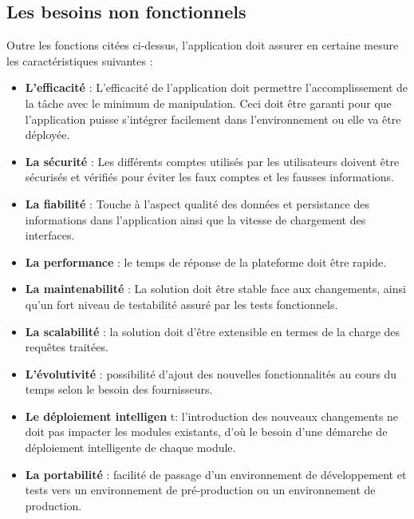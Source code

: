 \subsection{Les besoins non fonctionnels}
Outre les fonctions cit\'ees ci-dessus, l'application doit assurer en certaine mesure les caract\'eristiques suivantes :
\begin{itemize}
\item \textbf{L'efficacit\'e} : L'efficacit\'e de l'application doit permettre l'accomplissement de la t\^ache avec le minimum de manipulation. Ceci doit \^etre garanti pour que l'application puisse s'int\'egrer facilement dans l'environnement ou elle va \^etre d\'eploy\'ee.

\item \textbf{La s\'ecurit\'e} : Les diff\'erents comptes utilis\'es par les utilisateurs doivent \^etre s\'ecuris\'es et v\'erifi\'es pour \'eviter les faux comptes et les fausses informations.

\item \textbf{La fiabilit\'e} : Touche \`a l'aspect qualit\'e des donn\'ees et persistance des informations dans l'application ainsi que la vitesse de chargement des interfaces.
\item \textbf{La performance} : le temps de r\'eponse de la plateforme doit \^etre rapide.

\item \textbf{La maintenabilit\'e} : La solution doit \^etre stable face aux changements, ainsi qu'un fort niveau de testabilit\'e assur\'e par les tests fonctionnels.

\item \textbf{La scalabilit\'e} : la solution doit d'\^etre extensible en termes de la charge des requ\^etes trait\'ees.

\item \textbf{L'\'evolutivit\'e} : possibilit\'e d'ajout des nouvelles fonctionnalit\'es au cours du temps selon le besoin des fournisseurs.

\item \textbf{Le d\'eploiement intelligen} t: l'introduction des nouveaux changements ne doit pas impacter les modules existants, d'o\`u le besoin d'une d\'emarche de d\'eploiement intelligente de chaque module.

\item \textbf{La portabilit\'e} : facilit\'e de passage d'un environnement de d\'eveloppement et tests vers un environnement de pr\'e-production ou un environnement de production.
\end{itemize} 


